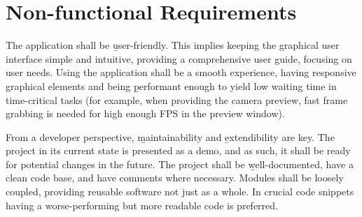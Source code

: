 
\section{Non-functional Requirements}

The application shall be \b{user-friendly}. This implies keeping the graphical user interface simple and intuitive, providing a comprehensive user guide, focusing on user needs. Using the application shall be a smooth experience, having responsive graphical elements and being \b{performant} enough to yield low waiting time in time-critical tasks (for example, when providing the camera preview, fast frame grabbing is needed for high enough FPS in the preview window).

From a developer perspective, \b{maintainability} and \b{extendibility} are key. The project in its current state is presented as a demo, and as such, it shall be ready for potential changes in the future. The project shall be \b{well-documented}, have a clean code base, and have comments where necessary. Modules shall be loosely coupled, providing reusable software not just as a whole. In crucial code snippets having a worse-performing but more readable code is preferred.
